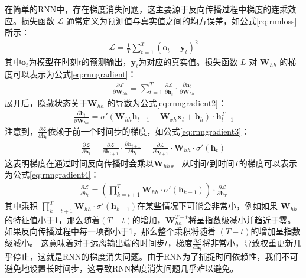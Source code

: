 在简单的RNN中，存在梯度消失问题，这主要源于反向传播过程中梯度的连乘效应\cite{schmidhuber1997long}。损失函数 $\mathcal{L}$ 通常定义为预测值与真实值之间的均方误差，如公式\eqref{eq:rnnloss}所示：
\begin{align}
  \mathcal{L} = \frac{1}{T}\sum_{t=1}^T(\mathbf{o}_t - \mathbf{y}_t)^2 \label{eq:rnnloss}
\end{align}
其中$\mathbf{o}_t$为模型在时刻$t$的预测输出，$\mathbf{y}_t$为对应的真实值。损失函数 $L$ 对 $\mathbf{W}_{hh}$ 的梯度可以表示为公式\eqref{eq:rnngradient}：
\begin{align}
  \frac{\partial \mathcal{L}}{\partial \mathbf{W}_{hh}} = \sum_{t=1}^{T} \frac{\partial \mathcal{L}}{\partial \mathbf{h}_t} \cdot \frac{\partial \mathbf{h}_t}{\partial \mathbf{W}_{hh}} \label{eq:rnngradient}
\end{align}
展开后，隐藏状态关于$\mathbf{W}_{hh}$ 的导数为公式\eqref{eq:rnngradient2}：
\begin{align}
  \frac{\partial \mathbf{h}_t}{\partial \mathbf{W}_{hh}} = \sigma'(\mathbf{W}_{hh} \mathbf{h}_{t-1} + \mathbf{W}_{xh} \mathbf{x}_t + \mathbf{b}_h) \cdot \mathbf{h}_{t-1}^T \label{eq:rnngradient2}
\end{align}
注意到，$\frac{\partial \mathcal{L}}{\partial \mathbf{h}_t}$依赖于前一个时间步的梯度，如公式\eqref{eq:rnngradient3}：
\begin{align}
  \frac{\partial \mathcal{L}}{\partial \mathbf{h}_t} = \frac{\partial \mathcal{L}}{\partial \mathbf{h}_{t+1}} \cdot \frac{\partial \mathbf{h}_{t+1}}{\partial \mathbf{h}_t} = \frac{\partial \mathcal{L}}{\partial \mathbf{h}_{t+1}} \cdot \mathbf{W}_{hh} \cdot \sigma'(\mathbf{h}_t) \label{eq:rnngradient3}
\end{align}
这表明梯度在通过时间反向传播时会乘以$\mathbf{W}_{hh}$。
从时间$t$到时间$T$的梯度可以表示为公式\eqref{eq:rnngradient4}：
\begin{align}
  \frac{\partial \mathcal{L}}{\partial \mathbf{h}_t} = \left( \prod_{k=t+1}^{T} \mathbf{W}_{hh} \cdot \sigma'(\mathbf{h}_{k-1}) \right) \cdot \frac{\partial \mathcal{L}}{\partial \mathbf{h}_T} \label{eq:rnngradient4}
\end{align}
其中乘积 $\prod_{k=t+1}^{T} \mathbf{W}_{hh} \cdot \sigma'(\mathbf{h}_{k-1})$在某些情况下可能会非常小，例如如果 $\mathbf{W}_{hh}$的特征值小于1，那么随着$(T - t)$的增加，$\mathbf{W}_{hh}^{T-t}$将呈指数级减小并趋近于零。
如果反向传播过程中每一项都小于1，那么整个乘积将随着 $(T - t)$的增加呈指数级减小。
这意味着对于远离输出端的时间步$t$，梯度$\frac{\partial \mathcal{L}}{\partial \mathbf{h}_t}$将非常小，导致权重更新几乎停止，这就是RNN的梯度消失问题。由于RNN为了捕捉时间依赖性，我们不可避免地设置长时间步，这导致RNN梯度消失问题几乎难以避免。

